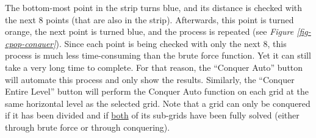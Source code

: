 The bottom-most point in the strip turns blue, and its distance is checked with 
the next 8 points (that are also in the strip). Afterwards, this point is 
turned orange, the next point is turned blue, and the process is repeated
(see \textit{Figure \ref{fig-cpop-conquer}}). 
\newline\newline
Since each point is being checked with only the next 8, this process is much 
less time-consuming than the brute force function. Yet it can still take a
very long time to complete. For that reason, the ``Conquer Auto'' button 
will automate this process and only show the results. Similarly, the 
``Conquer Entire Level'' button will perform the Conquer Auto function
on each grid at the same horizontal level as the selected grid. 
Note that a grid can only be conquered if it has been divided and if 
\underline{both} of its sub-grids have been fully solved 
(either through brute force or through conquering). 